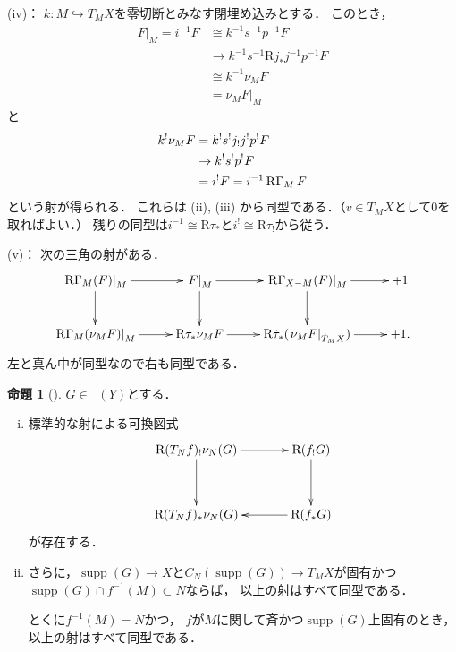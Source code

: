 \documentclass[uplatex,dvipdfmx,a4paper,10pt,draft]{jsarticle}
\makeatletter
\theoremstyle{definition}
\renewenvironment{proof}[1][\proofname]{\par
  \pushQED{\qed}%
  \normalfont \topsep6\p@\@plus6\p@\relax
  \trivlist
  \item[\hskip\labelsep
         \bfseries
    {#1}]\ignorespaces
}{%
  \popQED\endtrivlist\@endpefalse
}
\renewcommand{\proofname}{証明.}
\numberwithin{equation}{section}
\newcommand{\supp}{\mathop{\mathrm{supp}}\nolimits}
\newcommand{\Dompb}{\mathop{\mathsf{D}^\mathrm{b}}\nolimits}
\newcommand{\RG}{\mathop{\mathrm{R}\hspace{-0pt}\Gamma}\nolimits}
\newcommand{\Rder}{\mathrm{R}}
\newcommand{\mres}[2][]{{\left.{#1}\right\rvert}_{#2}}
\theoremstyle{mystyle}
\newtheorem{myprp}[mythm]{命題}
\newenvironment{prp}{\begin{prpbox}\begin{myprp}}{\end{myprp}\end{prpbox}}
\makeatother
\begin{document}
\begin{proof}
    (iv)：
    \(k\colon M\hookrightarrow T_{M}X\)を零切断とみなす閉埋め込みとする．
    このとき，\begin{align*}
        \mres[F]{M}
        =i^{-1}F
        &\cong k^{-1}s^{-1}p^{-1}F\\
        &\to k^{-1}s^{-1}\Rder{j}_{\ast}j^{-1}p^{-1}F\\
        &\cong k^{-1}\nu_{M}F\\
        &=\mres[\nu_{M}F]{M}
    \end{align*}
    と\begin{align*}
        k^{!}\nu_{M}F
        &= k^{!}s^{!}j_{!}j^{!}p^{!}F\\
        &\to k^{!}s^{!}p^{!}F\\
        &= i^{!}F=i^{-1}\RG_{M}F
    \end{align*}
    という射が得られる．
    これらは (ii), (iii) から同型である．（\(v\in T_{M}X\)として\(0\)を取ればよい．）
    残りの同型は\(i^{-1}\cong \Rder{\tau}_{\ast}\)と\(i^{!}\cong \Rder{\tau}_{!}\)から従う．

    (v)：
    次の三角の射がある．
    \[    
        \vcenter{\xymatrix@C=26pt@R=26pt{
        \mres[\RG_{M}(F)]{M}    
        \ar[d]
        \ar[r]
        &
        \mres[F]{M}    
        \ar[r]
        \ar[d]
        &
        \mres[\RG_{X-M}(F)]{M}    
        \ar[r]
        \ar[d]
        &
        +1
        \\
        \mres[\RG_{M}(\nu_{M}F)]{M}    
        \ar[r]
        &
        \Rder{\tau_{\ast}}\nu_{M}F    
        \ar[r]
        &
        \Rder{\dot{\tau}}_{\ast}(\mres[\nu_{M}F]{\dot{T}_{M}X})    
        \ar[r]
        &
        +1.
      }}
    \]
    左と真ん中が同型なので右も同型である．
\end{proof}

\begin{prp}[{\cite[Prop.4.2.4]{KS90}}]
    \(G\in\Dompb(Y)\)とする．
    \begin{enumerate}[(i)]
        \item 標準的な射による可換図式\[    
            \vcenter{\xymatrix@C=36pt@R=36pt{
            \Rder(T_{N}f)_{!}\nu_{N}(G)
            \ar[d]
            \ar[r]
            &
            \Rder({f_{!}}G)
            \ar[d]
            \\
            \Rder(T_{N}f)_{\ast}\nu_{N}(G)
            &
            \Rder({f_{\ast}}G)
            \ar[l]
          }}
        \]が存在する．
        \item さらに，\(\supp(G)\to X\)と\(
            C_N(\supp(G))\to T_{M}X
        \)が固有かつ\(\supp(G)\cap f^{-1}(M)\subset N\)ならば，
        以上の射はすべて同型である．
        
        とくに\(f^{-1}(M)=N\)かつ，
        \(f\)が\(M\)に関して斉かつ\(\supp(G)\)上固有のとき，
        以上の射はすべて同型である．
    \end{enumerate}
\end{prp}
\end{document}

